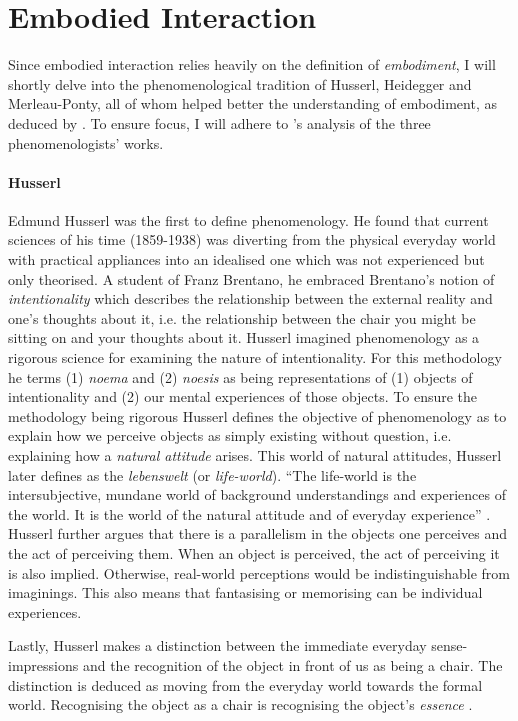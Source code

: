 \section{Embodied Interaction}
Since embodied interaction relies heavily on the definition of \textit{embodiment}, I will shortly delve into the phenomenological tradition of Husserl, Heidegger and Merleau-Ponty, all of whom helped better the understanding of embodiment, as deduced by . To ensure focus, I will adhere to \citeauthor{dourish}'s \citeyear{dourish} analysis of the three phenomenologists' works.

\paragraph{Husserl} Edmund Husserl was the first to define phenomenology. He found that current sciences of his time (1859-1938) was diverting from the physical everyday world with practical appliances into an idealised one which was not experienced but only theorised. A student of Franz Brentano, he embraced Brentano's notion of \textit{intentionality} which describes the relationship between the external reality and one's thoughts about it, i.e. the relationship between the chair you might be sitting on and your thoughts about it. Husserl imagined phenomenology as a rigorous science for examining the nature of intentionality. For this methodology he terms (1) \textit{noema} and (2) \textit{noesis} as being representations of (1) objects of intentionality and (2) our mental experiences of those objects. To ensure the methodology being rigorous Husserl defines the objective of phenomenology as to explain how we perceive objects as simply existing without question, i.e. explaining how a \textit{natural attitude} arises. This world of natural attitudes, Husserl later defines as the \textit{lebenswelt} (or \textit{life-world}). ``The life-world is the intersubjective, mundane world of background understandings and experiences of the world. It is the world of the natural attitude and of everyday experience'' \cite[p. 106]{dourish}. Husserl further argues that there is a parallelism in the objects one perceives and the act of perceiving them. When an object is perceived, the act of perceiving it is also implied. Otherwise, real-world perceptions would be indistinguishable from imaginings. This also means that fantasising or memorising can be individual experiences.

Lastly, Husserl makes a distinction between the immediate everyday sense-impressions and the recognition of the object in front of us as being a chair. The distinction is deduced as moving from the everyday world towards the formal world. Recognising the object as a chair is recognising the object's \textit{essence} \cite{dourish}.

